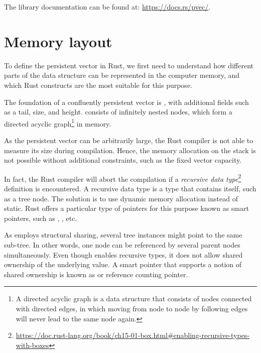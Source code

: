 The library documentation can be found at: \url{https://docs.rs/pvec/}.


\section{Memory layout}
To define the persistent vector in Rust, we first need to understand how different parts of the data structure can be represented in the computer memory, and which Rust constructs are the most suitable for this purpose.

The foundation of a confluently persistent vector is \rrbtree{}, with additional fields such as a tail, size, and height. \rrbtree{} consists of infinitely nested nodes, which form a directed acyclic graph\footnote{A directed acyclic graph is a data structure that consists of nodes connected with directed edges, in which moving from node to node by following edges will never lead to the same node again.} in memory.

As the persistent vector can be arbitrarily large, the Rust compiler is not able to measure its size during compilation. Hence, the memory allocation on the stack is not possible without additional constraints, such as the fixed vector capacity.

In fact, the Rust compiler will abort the compilation if a \emph{recursive data type}\footnote{\url{https://doc.rust-lang.org/book/ch15-01-box.html\#enabling-recursive-types-with-boxes}} definition is encountered. A recursive data type is a type that contains itself, such as a tree node. The solution is to use dynamic memory allocation instead of static. Rust offers a particular type of pointers for this purpose known as smart pointers, such as \boxptr{}, \rc{}, etc.

As \rrbtree{} employs structural sharing, several tree instances might point to the same sub-tree. In other words, one node can be referenced by several parent nodes simultaneously. Even though \boxptr{} enables recursive types, it does not allow shared ownership of the underlying value. A smart pointer that supports a notion of shared ownership is known as \rc{} or reference counting pointer.


